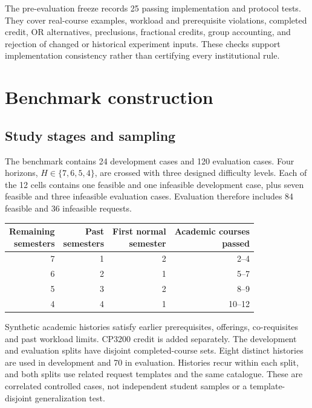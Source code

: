 \documentclass[11pt,a4paper]{article}
\begin{document}
The pre-evaluation freeze records 25 passing implementation and protocol
tests. They cover real-course examples, workload and prerequisite violations,
completed credit, OR alternatives, preclusions, fractional credits, group
accounting, and rejection of changed or historical experiment inputs.
These checks support implementation consistency rather than certifying every
institutional rule.

\par
\section{Benchmark construction}
\subsection{Study stages and sampling}
The benchmark contains 24 development cases and 120 evaluation cases. Four
horizons, $H\in\{7,6,5,4\}$, are crossed with three designed difficulty levels.
Each of the 12 cells contains one feasible and one infeasible development
case, plus seven feasible and three infeasible evaluation cases. Evaluation
therefore includes 84 feasible and 36 infeasible requests.

\begin{center}
\begin{minipage}{\linewidth}
\label{tab:stages}
\begin{tabular}{@{}rrrr@{}}
\toprule
\shortstack{Remaining\\semesters} & \shortstack{Past\\semesters} &
\shortstack{First normal\\semester} & \shortstack{Academic courses\\passed}\\
\midrule
7 & 1 & 2 & 2--4\\
6 & 2 & 1 & 5--7\\
5 & 3 & 2 & 8--9\\
4 & 4 & 1 & 10--12\\
\bottomrule
\end{tabular}
\end{minipage}
\end{center}

Synthetic academic histories satisfy earlier prerequisites, offerings,
co-requisites and past workload limits. CP3200 credit is added separately.
The development and evaluation splits have disjoint completed-course sets.
Eight distinct histories are used in development and 70 in evaluation.
Histories recur within each split, and both splits use related request
templates and the same catalogue. These are correlated controlled cases,
not independent student samples or a template-disjoint generalization test.
\end{document}
